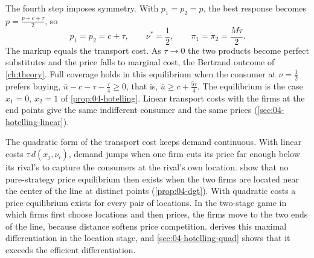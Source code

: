 \begin{example}
The fourth step imposes symmetry. With $p_1 = p_2 = p$, the best response becomes $p = \frac{p + c + \tau}{2}$,
so
\begin{equation}\label{eq:06-hotelling-eq}
  p_1 = p_2 = c + \tau, \qquad \nu^* = \frac{1}{2}, \qquad \pi_1 = \pi_2 = \frac{M\tau}{2}.
\end{equation}
The markup equals the transport cost. As $\tau \to 0$ the two products become perfect substitutes and
the price falls to marginal cost, the Bertrand outcome of \cref{ch:theory}. Full coverage holds in this
equilibrium when the consumer at $\nu = \frac{1}{2}$ prefers buying, $\bar u - c - \tau - \frac{\tau}{4}
\ge 0$, that is, $\bar u \ge c + \frac{5\tau}{4}$. The equilibrium is the case $x_1 = 0$, $x_2 = 1$ of
\cref{prop:04-hotelling}. Linear transport costs with the firms at the end points give the same indifferent
consumer and the same prices (\cref{sec:04-hotelling-linear}).
\end{example}

The quadratic form of the transport cost keeps demand continuous. With linear costs
$\tau\, d(x_j, \nu_i)$, demand jumps when one firm cuts its price far enough below its rival's to capture
the consumers at the rival's own location. \citet{DAspremontGabszewiczThisse1979} show that no pure-strategy
price equilibrium then exists when the two firms are located near the center of the line at distinct points
(\cref{prop:04-dgt}). With quadratic costs a price equilibrium exists for every pair of locations. In the two-stage game in which firms first choose locations and then prices, the firms move to
the two ends of the line, because distance softens price competition.  derives this
maximal differentiation in the location stage, and \cref{sec:04-hotelling-quad} shows that it exceeds the
efficient differentiation.

